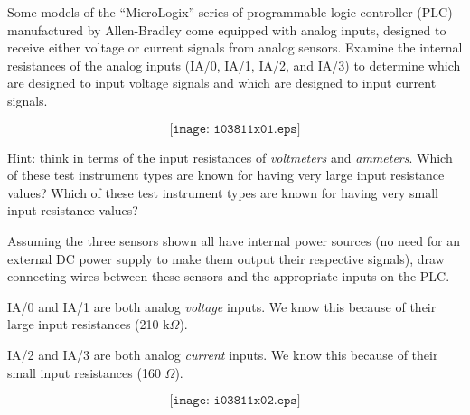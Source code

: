

Some models of the ``MicroLogix'' series of programmable logic controller (PLC) manufactured by Allen-Bradley come equipped with analog inputs, designed to receive either voltage or current signals from analog sensors.  Examine the internal resistances of the analog inputs (IA/0, IA/1, IA/2, and IA/3) to determine which are designed to input voltage signals and which are designed to input current signals.

$$\texttt{[image: i03811x01.eps]}$$

Hint: think in terms of the input resistances of {\it voltmeters} and {\it ammeters}.  Which of these test instrument types are known for having very large input resistance values?   Which of these test instrument types are known for having very small input resistance values?

\vskip 10pt

Assuming the three sensors shown all have internal power sources (no need for an external DC power supply to make them output their respective signals), draw connecting wires between these sensors and the appropriate inputs on the PLC.







IA/0 and IA/1 are both analog {\it voltage} inputs.  We know this because of their large input resistances (210 k$\Omega$).

\vskip 10pt

IA/2 and IA/3 are both analog {\it current} inputs.  We know this because of their small input resistances (160 $\Omega$).

\vskip 10pt

$$\texttt{[image: i03811x02.eps]}$$










